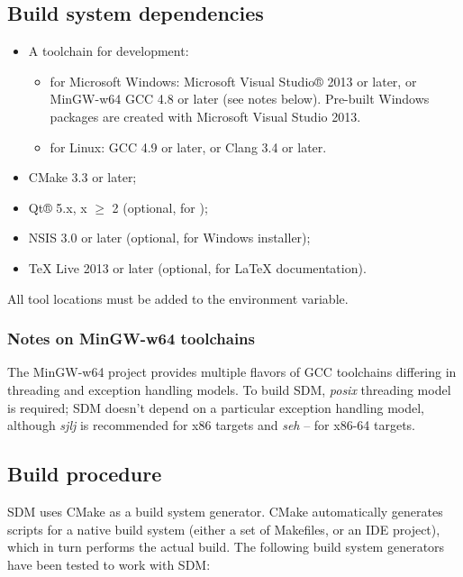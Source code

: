 \documentclass[a4paper,12pt,twoside,extrafontsizes]{memoir}
\begin{document}
\subsection{Build system dependencies}
\label{subsec:dependencies}

\begin{itemize}
	\item A toolchain for \cplusplus{} development:
		\begin{itemize}
			\item for Microsoft Windows: Microsoft Visual Studio® 2013 or later, or MinGW-w64 GCC 4.8 or later (see notes below). Pre-built Windows packages are created with Microsoft Visual Studio 2013.
			\item for Linux: GCC 4.9 or later, or Clang 3.4 or later.
		\end{itemize}
	\item CMake 3.3 or later;
	\item Qt® 5.x, x $\ge$ 2 (optional, for );
	\item NSIS 3.0 or later (optional, for Windows installer);
	\item TeX Live 2013 or later (optional, for \LaTeX{} documentation).
\end{itemize}

All tool locations must be added to the  environment variable.

\subsubsection{Notes on MinGW-w64 toolchains}

The MinGW-w64 project provides multiple flavors of GCC toolchains differing in threading and exception handling models. To build SDM, \emph{posix} threading model is required; SDM doesn't depend on a particular exception handling model, although \emph{sjlj} is recommended for x86 targets and \emph{seh} -- for x86-64 targets.

\subsection{Build procedure}

SDM uses CMake as a build system generator. CMake automatically generates scripts for a native build system (either a set of Makefiles, or an IDE project), which in turn performs the actual build. The following build system generators have been tested to work with SDM:
\end{document}
